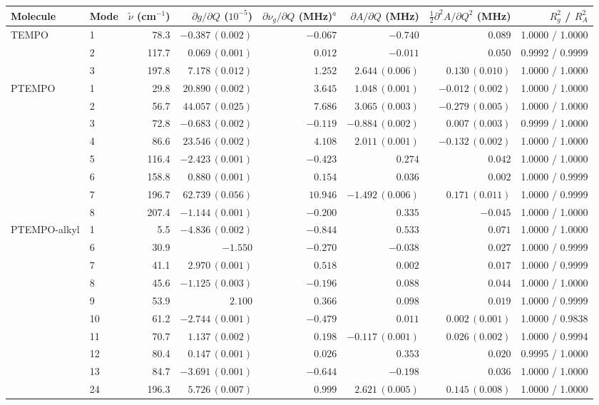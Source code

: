\begin{tabular}{llrrrrrr}
\toprule
Molecule & Mode & $\tilde\nu$ (cm$^{-1}$) & $\partial g/\partial Q$ ($10^{-5}$) & $\partial\nu_g/\partial Q$ (MHz)$^a$ & $\partial A/\partial Q$ (MHz) & $\tfrac12\partial^2A/\partial Q^2$ (MHz) & $R^2_g$ / $R^2_A$\\
\midrule
TEMPO & 1 & 78.3 & $-0.387\,(0.002)$ & $-0.067$ & $-0.740$ & $0.089$ & 1.0000 / 1.0000\\
 & 2 & 117.7 & $0.069\,(0.001)$ & $0.012$ & $-0.011$ & $0.050$ & 0.9992 / 0.9999\\
 & 3 & 197.8 & $7.178\,(0.012)$ & $1.252$ & $2.644\,(0.006)$ & $0.130\,(0.010)$ & 1.0000 / 1.0000\\
\midrule
PTEMPO & 1 & 29.8 & $20.890\,(0.002)$ & $3.645$ & $1.048\,(0.001)$ & $-0.012\,(0.002)$ & 1.0000 / 1.0000\\
 & 2 & 56.7 & $44.057\,(0.025)$ & $7.686$ & $3.065\,(0.003)$ & $-0.279\,(0.005)$ & 1.0000 / 1.0000\\
 & 3 & 72.8 & $-0.683\,(0.002)$ & $-0.119$ & $-0.884\,(0.002)$ & $0.007\,(0.003)$ & 0.9999 / 1.0000\\
 & 4 & 86.6 & $23.546\,(0.002)$ & $4.108$ & $2.011\,(0.001)$ & $-0.132\,(0.002)$ & 1.0000 / 1.0000\\
 & 5 & 116.4 & $-2.423\,(0.001)$ & $-0.423$ & $0.274$ & $0.042$ & 1.0000 / 1.0000\\
 & 6 & 158.8 & $0.880\,(0.001)$ & $0.154$ & $0.036$ & $0.002$ & 1.0000 / 0.9999\\
 & 7 & 196.7 & $62.739\,(0.056)$ & $10.946$ & $-1.492\,(0.006)$ & $0.171\,(0.011)$ & 1.0000 / 0.9999\\
 & 8 & 207.4 & $-1.144\,(0.001)$ & $-0.200$ & $0.335$ & $-0.045$ & 1.0000 / 1.0000\\
\midrule
PTEMPO-alkyl & 1 & 5.5 & $-4.836\,(0.002)$ & $-0.844$ & $0.533$ & $0.071$ & 1.0000 / 1.0000\\
 & 6 & 30.9 & $-1.550$ & $-0.270$ & $-0.038$ & $0.027$ & 1.0000 / 0.9999\\
 & 7 & 41.1 & $2.970\,(0.001)$ & $0.518$ & $0.002$ & $0.017$ & 1.0000 / 0.9999\\
 & 8 & 45.6 & $-1.125\,(0.003)$ & $-0.196$ & $0.088$ & $0.044$ & 1.0000 / 1.0000\\
 & 9 & 53.9 & $2.100$ & $0.366$ & $0.098$ & $0.019$ & 1.0000 / 0.9999\\
 & 10 & 61.2 & $-2.744\,(0.001)$ & $-0.479$ & $0.011$ & $0.002\,(0.001)$ & 1.0000 / 0.9838\\
 & 11 & 70.7 & $1.137\,(0.002)$ & $0.198$ & $-0.117\,(0.001)$ & $0.026\,(0.002)$ & 1.0000 / 0.9994\\
 & 12 & 80.4 & $0.147\,(0.001)$ & $0.026$ & $0.353$ & $0.020$ & 0.9995 / 1.0000\\
 & 13 & 84.7 & $-3.691\,(0.001)$ & $-0.644$ & $-0.198$ & $0.036$ & 1.0000 / 1.0000\\
 & 24 & 196.3 & $5.726\,(0.007)$ & $0.999$ & $2.621\,(0.005)$ & $0.145\,(0.008)$ & 1.0000 / 1.0000\\
\bottomrule
\end{tabular}
